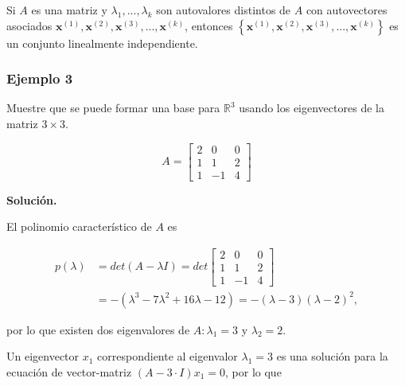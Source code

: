 \documentclass{report}
\numberwithin{subsection}{section} %
\begin{document}
Si $A$ es una matriz y $\lambda_{1}, ..., \lambda_{k}$ son autovalores distintos de $A$ con autovectores asociados $\textbf{x}^{\left( 1 \right)}, \textbf{x}^{\left( 2 \right)}, \textbf{x}^{\left( 3 \right)}, ..., \textbf{x}^{\left( k \right)}$, entonces $\left\{ \textbf{x}^{\left( 1 \right)}, \textbf{x}^{\left( 2 \right)}, \textbf{x}^{\left( 3 \right)}, ..., \textbf{x}^{\left( k \right)} \right\}$ es un conjunto linealmente independiente.

\subsubsection*{Ejemplo 3}

Muestre que se puede formar una base para $\mathbb{R}^3$ usando los eigenvectores de la matriz $3 \times 3$.
   
    \begin{equation*}
        A =\begin{bmatrix}
        2 & 0 & 0 \\
        1 & 1 & 2 \\
        1 & -1 & 4
        \end{bmatrix}
    \end{equation*}

    {\bf Solución.}

    El polinomio característico de $A$ es

    \begin{align*}
        p(\lambda) &= det(A - \lambda I) = det\begin{bmatrix}
                                                2 & 0 & 0 \\
                                                1 & 1 & 2 \\
                                                1 & -1 & 4
                                                \end{bmatrix} \\
        &= -(\lambda^3 - 7\lambda^2 + 16\lambda  - 12) = -(\lambda  - 3)(\lambda  - 2)^2,
    \end{align*}

    por lo que existen dos eigenvalores de $A: \lambda_1 = 3$ y $\lambda_2 = 2$.

    Un eigenvector $x_1$ correspondiente al eigenvalor $\lambda_1 = 3$ es una solución para la ecuación de vector-matriz $(A - 3 · I )x_1 = 0$, por lo que \\
\end{document}
